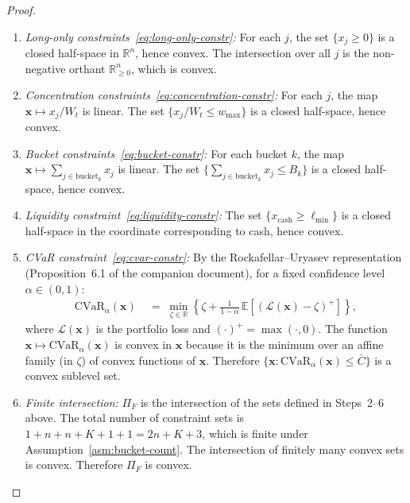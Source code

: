\documentclass[12pt,openany]{book}
\newcommand{\bfx}{\mathbf{x}}
\numberwithin{equation}{chapter}
\theoremstyle{plain}
\theoremstyle{definition}
\theoremstyle{remark}
\numberwithin{equation}{chapter}
\theoremstyle{plain}
\begin{document}
\begin{proof}
\begin{enumerate}
  \item \textit{Long-only constraints~\eqref{eq:long-only-constr}:}
        For each $j$, the set $\{x_j \geq 0\}$ is a closed half-space
        in $\mathbb{R}^n$, hence convex.  The intersection over all
        $j$ is the non-negative orthant $\mathbb{R}_{\geq 0}^n$,
        which is convex.

  \item \textit{Concentration constraints~\eqref{eq:concentration-constr}:}
        For each $j$, the map $\bfx \mapsto x_j / W_t$ is linear.
        The set $\{x_j / W_t \leq w_{\max}\}$ is a closed half-space,
        hence convex.

  \item \textit{Bucket constraints~\eqref{eq:bucket-constr}:}
        For each bucket $k$, the map
        $\bfx \mapsto \sum_{j \in \mathrm{bucket}_k} x_j$ is linear.
        The set
        $\bigl\{\sum_{j \in \mathrm{bucket}_k} x_j \leq B_k\bigr\}$
        is a closed half-space, hence convex.

  \item \textit{Liquidity constraint~\eqref{eq:liquidity-constr}:}
        The set $\{x_{\mathrm{cash}} \geq \ell_{\min}\}$ is a closed
        half-space in the coordinate corresponding to cash, hence convex.

  \item \textit{CVaR constraint~\eqref{eq:cvar-constr}:}
        By the Rockafellar--Uryasev representation
        (Proposition~6.1 of the companion document), for a fixed
        confidence level $\alpha \in (0,1)$:
        \begin{align}
          \mathrm{CVaR}_\alpha(\bfx)
          &\;=\; \min_{\zeta \in \mathbb{R}}
            \left\{
              \zeta + \frac{1}{1-\alpha}
              \,\mathbb{E}\!\left[(\mathcal{L}(\bfx) - \zeta)^+\right]
            \right\},
        \end{align}
        where $\mathcal{L}(\bfx)$ is the portfolio loss and
        $(\cdot)^+ = \max(\cdot, 0)$.  The function
        $\bfx \mapsto \mathrm{CVaR}_\alpha(\bfx)$ is convex in $\bfx$
        because it is the minimum over an affine family (in $\zeta$)
        of convex functions of $\bfx$.  Therefore
        $\{\bfx : \mathrm{CVaR}_\alpha(\bfx) \leq \bar{C}\}$
        is a convex sublevel set.

  \item \textit{Finite intersection:}
        $\Pi_F$ is the intersection of the sets defined in
        Steps~2--6 above.  The total number of constraint sets is
        $1 + n + n + K + 1 + 1 = 2n + K + 3$, which is finite under
        Assumption~\ref{asm:bucket-count}.  The intersection of
        finitely many convex sets is convex.  Therefore $\Pi_F$ is
        convex.
\end{enumerate}


\end{proof}
\end{document}

